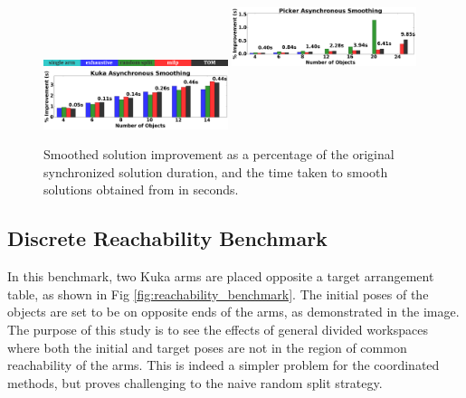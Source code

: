 {%
\begin{figure}[h]
	\centering	
	\includegraphics[width=0.48\textwidth]{figures/results/labels}
	\includegraphics[width=0.48\textwidth]{figures/results/sp_smoothing}
	\includegraphics[width=0.48\textwidth]{figures/results/kuka_smoothing}
	\caption{Smoothed solution improvement as a percentage of the original synchronized solution duration, and the time taken to smooth solutions obtained from \algo in seconds.}
	\label{fig:smoothing}
\end{figure}

\subsection{Discrete Reachability Benchmark}
In this benchmark, two Kuka arms are placed opposite a target arrangement table, as shown in Fig \ref{fig:reachability_benchmark}. The initial poses of the objects are set to be on opposite ends of the arms, as demonstrated in the image. The purpose of this study is to see the effects of general divided workspaces where both the initial and target poses are not in the region of common reachability of the arms. This is indeed a simpler problem for the coordinated methods, but proves challenging to the naive random split strategy. 

}
